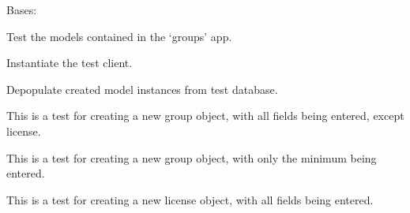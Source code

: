 \documentclass[letterpaper,10pt,english]{sphinxmanual}
\begin{document}
\begin{fulllineitems}
\label{api:groups.tests.GroupsModelTests}
Bases: 

Test the models contained in the `groups' app.

\begin{fulllineitems}
\label{api:groups.tests.GroupsModelTests.setUp}
Instantiate the test client.

\end{fulllineitems}


\begin{fulllineitems}
\label{api:groups.tests.GroupsModelTests.tearDown}
Depopulate created model instances from test database.

\end{fulllineitems}


\begin{fulllineitems}
\label{api:groups.tests.GroupsModelTests.test_create_group_all_fields}
This is a test for creating a new group object, with all fields being entered, except license.

\end{fulllineitems}


\begin{fulllineitems}
\label{api:groups.tests.GroupsModelTests.test_create_group_minimal}
This is a test for creating a new group object, with only the minimum being entered.

\end{fulllineitems}


\begin{fulllineitems}
\label{api:groups.tests.GroupsModelTests.test_create_license_all_fields}
This is a test for creating a new license object, with all fields being entered.


\end{fulllineitems}
\end{fulllineitems}
\end{document}
